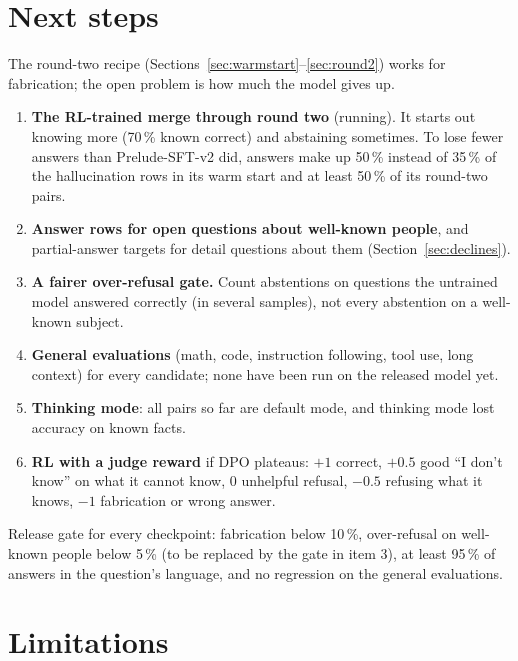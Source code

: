 \documentclass[11pt,a4paper]{article}
\begin{document}
\section{Next steps}
\label{sec:next}

The round-two recipe (Sections~\ref{sec:warmstart}--\ref{sec:round2}) works for fabrication; the open problem is how much the model gives up.
\begin{enumerate}
  \item \textbf{The RL-trained merge through round two} (running). It starts out knowing more (70\,\% known correct) and abstaining sometimes. To lose fewer answers than Prelude-SFT-v2 did, answers make up 50\,\% instead of 35\,\% of the hallucination rows in its warm start and at least 50\,\% of its round-two pairs.
  \item \textbf{Answer rows for open questions about well-known people}, and partial-answer targets for detail questions about them (Section~\ref{sec:declines}).
  \item \textbf{A fairer over-refusal gate.} Count abstentions on questions the untrained model answered correctly (in several samples), not every abstention on a well-known subject.
  \item \textbf{General evaluations} (math, code, instruction following, tool use, long context) for every candidate; none have been run on the released model yet.
  \item \textbf{Thinking mode}: all pairs so far are default mode, and thinking mode lost accuracy on known facts.
  \item \textbf{RL with a judge reward} if DPO plateaus: $+1$ correct, $+0.5$ good ``I don't know'' on what it cannot know, $0$ unhelpful refusal, $-0.5$ refusing what it knows, $-1$ fabrication or wrong answer.
\end{enumerate}
Release gate for every checkpoint: fabrication below 10\,\%, over-refusal on well-known people below 5\,\% (to be replaced by the gate in item 3), at least 95\,\% of answers in the question's language, and no regression on the general evaluations.

\section{Limitations}
\end{document}

